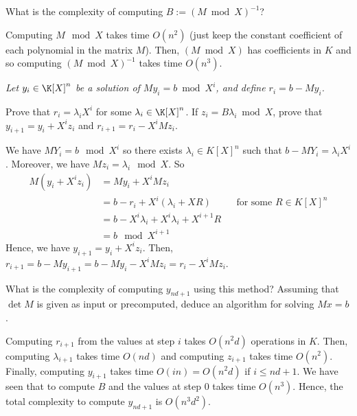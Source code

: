 \documentclass[11pt]{exam}
\theoremstyle{definition}
\begin{document}
\begin{questions}
	
	\question What is the complexity of computing $B := (M \bmod X)^{-1}$?
	
	\begin{solution}
		Computing $M \mod X$ takes time $O(n^2)$ (just keep the constant coefficient of each polynomial in the matrix $M$). Then, $(M \bmod X)$ has coefficients in $K$ and so computing $(M \bmod X)^{-1}$ takes time $O(n^3)$.
	\end{solution}
	
	
	{\em Let $y_i \in \K[X]^n$ be a solution of $My_i = b \bmod X^i$, and define $r_i = b - My_i$.}
	
	\question Prove that $r_i = \lambda_i X^i$ for some $\lambda_i \in \K[X]^n$.
	If $z_i = B\lambda_i \bmod X$, prove that
	$y_{i+1} = y_i + X^i z_i$ and $r_{i+1} = r_i - X^i Mz_i$.
	
	\begin{solution}
		We have $MY_i = b \mod X^i$ so there exists $\lambda_i \in K[X]^n$ such that $b- MY_i = \lambda_i X^i$. Moreover, we have $Mz_i = \lambda_i \mod X$. So
		\begin{align*}
		M(y_i + X^i z_i)
		&= My_i + X^i Mz_i \\
		&= b-r_i + X^i (\lambda_i + XR) && \text{for some $R\in K[X]^n$} \\
		&= b-X^i \lambda_i  + X^i \lambda_i + X^{i+1}R \\
		&= b \mod X^{i+1} 
		\end{align*}
		Hence, we have $y_{i+1} = y_i + X^i z_i$. Then, $r_{i+1} = b-My_{i+1} = b-My_i-X^i Mz_i = r_i -X^i Mz_i$.
	\end{solution}
	
	\question What is the complexity of computing $y_{nd+1}$ using this method? Assuming
	that $\det M$ is given as input or precomputed, deduce an algorithm for solving
	$Mx = b$.
	
	\begin{solution}
		Computing $r_{i+1}$ from the values at step $i$ takes $O(n^2d)$ operations in $K$. Then, computing $\lambda_{i+1}$ takes time $O(nd)$ and computing $z_{i+1}$ takes time $O(n^2)$. Finally, computing $y_{i+1}$ takes time $O(in) = O(n^2d)$ if $i \leq nd+1$. We have seen that to compute $B$ and the values at step $0$ takes time $O(n^3)$. Hence, the total complexity to compute $y_{nd+1}$ is $O(n^3d^2)$.
		

\end{solution}
\end{questions}
\end{document}
